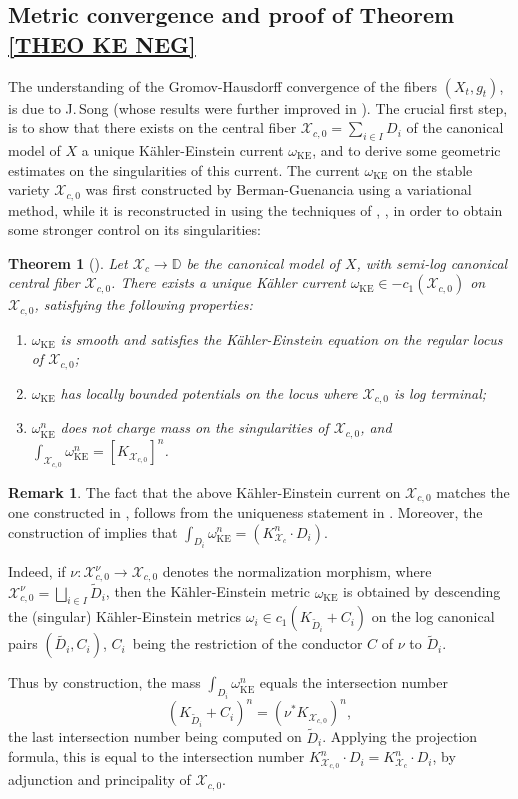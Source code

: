 \documentclass[JEP,XML,SOM,Unicode,published]{cedram}
\newenvironment{enumeratei}
{\bgroup\def\theenumi{\roman{enumi}}\def\theenumii{\arabic{enumii}}\begin{enumerate}}
{\end{enumerate}\egroup}
\newtheorem{theo}[equation]{Theorem}
\theoremstyle{definition}
\newtheorem{rem}[equation]{Remark}
\newcommand \D {\mathbb{D}}
\newcommand \X {\mathscr{X}}
\DeclareMathOperator{\KE}{KE}
\begin{document}
\subsection{Metric convergence and proof of Theorem \ref{THEO KE NEG}} \label{CV KE neg}
The understanding of the Gromov-Hausdorff convergence of the fibers $(X_t, g_t)$, is due to J.\,Song \cite{Song} (whose results were further improved in \cite{SSW}). The crucial first step, is to show that there exists on the central fiber $\X_{c,0} = \sum_{i \in I} D_i$ of the canonical model of $X$ a unique Kähler-Einstein current $\omega_{\KE}$, and to derive some geometric estimates on the singularities of this current. The current $\omega_{\KE}$ on the stable variety $\X_{c,0}$ was first constructed by Berman-Guenancia \cite{BG} using a variational method, while it is reconstructed in \cite{Song} using the techniques of \cite{EGZ}, \cite{Kolo}, in order to obtain some stronger control on its singularities:
\begin{theo}[{\cite[Th.\,1.1]{Song}}]
Let $\X_c \to \D$ be the canonical model of $X$, with semi-log canonical central fiber $\X_{c,0}$.
There exists a unique Kähler current $\omega_{\KE} \in - c_1(\X_{c,0})$ on $\X_{c,0}$, satisfying the following properties:
\begin{enumeratei}
\item
$\omega_{\KE}$ is smooth and satisfies the Kähler-Einstein equation on the regular locus of $\X_{c,0}$;

\item
$\omega_{\KE}$ has locally bounded potentials on the locus where $\X_{c,0}$ is log terminal;

\item
$\omega_{\KE}^n$ does not charge mass on the singularities of $\X_{c,0}$, and $\int_{\X_{c,0}} \omega_{\KE}^n = [K_{\X_{c,0}}]^n$.
\end{enumeratei}
\end{theo}
\begin{rem}
The fact that the above Kähler-Einstein current on $\X_{c,0}$ matches the one constructed in \cite{BG}, follows from the uniqueness statement in \cite[Th.\,A]{BG}. Moreover, the construction of \cite{BG} implies that $\int_{D_i} \omega_{\KE}^n = (K_{\X_c}^n \cdot D_i)$.

Indeed, if $\nu: \X^{\nu}_{c,0} \to \X_{c,0}$ denotes the normalization morphism, where $\X_{c,0}^{\nu} = \bigsqcup_{i \in I} \tilde{D}_i$, then the Kähler-Einstein metric $\omega_{\KE}$ is obtained by descending the (singular) Kähler-Einstein metrics $\omega_i \in c_1(K_{\tilde{D}_i} + C_i)$ on the log canonical pairs $(\tilde{D_i}, C_i)$, $C_i$~being the restriction of the conductor $C$ of $\nu$ to $\tilde{D}_i$.

Thus by construction, the mass $\int_{D_i} \omega_{\KE}^n$ equals the intersection number
\[
(K_{\tilde{D}_i} + C_i)^n = (\nu^* K_{\X_{c,0}})^n,
\]
the last intersection number being computed on $\tilde{D}_i$. Applying the projection formula, this is equal to the intersection number $ K_{\X_{c,0}}^n \cdot D_i =K_{\X_c}^n \cdot D_i$, by adjunction and principality of $\X_{c,0}$.
\end{rem}
\end{document}

